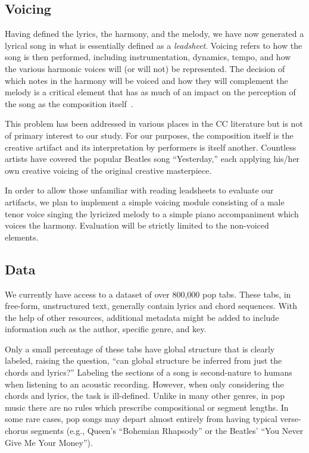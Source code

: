 \documentclass[11pt,phd]{byuprop}
\begin{document}
\subsection{Voicing}

Having defined the lyrics, the harmony, and the melody, we have now generated a lyrical song in what is essentially defined as a \emph{leadsheet}. Voicing refers to how the song is then performed, including instrumentation, dynamics, tempo, and how the various harmonic voices will (or will not) be represented. The decision of which notes in the harmony will be voiced and how they will complement the melody is a critical element that has as much of an impact on the perception of the song as the composition itself~\cite{papadopoulos1999ai}.

This problem has been addressed in various places in the CC literature but is not of primary interest to our study. For our purposes, the composition itself is the creative artifact and its interpretation by performers is itself another. Countless artists have covered the popular Beatles song ``Yesterday,'' each applying his/her own creative voicing of the original creative masterpiece.

In order to allow those unfamiliar with reading leadsheets to evaluate our artifacts, we plan to implement a simple voicing module consisting of a male tenor voice singing the lyricized melody to a simple piano accompaniment which voices the harmony. Evaluation will be strictly limited to the non-voiced elements.

\subsection{Data}

We currently have access to a dataset of over 800,000 pop tabs. These tabs, in free-form, unstructured text, generally contain lyrics and chord sequences. With the help of other resources, additional metadata might be added to include information such as the author, specific genre, and key.

Only a small percentage of these tabs have global structure that is clearly labeled, raising the question, ``can global structure be inferred from just the chords and lyrics?'' Labeling the sections of a song is second-nature to humans when listening to an acoustic recording. However, when only considering the chords and lyrics, the task is ill-defined. Unlike in many other genres, in pop music there are no rules which prescribe compositional or segment lengths. In some rare cases, pop songs may depart almost entirely from having typical verse-chorus segments (e.g., Queen's ``Bohemian Rhapsody'' or the Beatles' ``You Never Give Me Your Money'').
\end{document}
